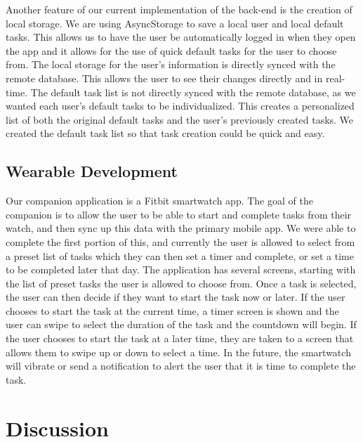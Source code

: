 \documentclass{sigchi}
\begin{document}
Another feature of our current implementation of the back-end is the creation
of local storage. We are using AsyncStorage to save a local user and local
default tasks. This allows us to have the user be automatically logged in when
they open the app and it allows for the use of quick default tasks for the user
to choose from. The local storage for the user’s information is directly synced
with the remote database. This allows the user to see their changes directly
and in real-time. The default task list is not directly synced with the remote
database, as we wanted each user’s default tasks to be individualized. This
creates a personalized list of both the original default tasks and the user’s
previously created tasks. We created the default task list so that task
creation could be quick and easy.

\subsection{Wearable Development}
Our companion application is a Fitbit smartwatch app. The goal of the companion
is to allow the user to be able to start and complete tasks from their watch,
and then sync up this data with the primary mobile app. We were able to complete
the first portion of this, and currently the user is allowed to select from a
preset list of tasks which they can then set a timer and complete, or set a
time to be completed later that day. The application has several screens,
starting with the list of preset tasks the user is allowed to choose from. Once
a task is selected, the user can then decide if they want to start the task
now or later. If the user chooses to start the task at the current time, a
timer screen is shown and the user can swipe to select the duration of the task
and the countdown will begin. If the user chooses to start the task at a later
time, they are taken to a screen that allows them to swipe up or down to select
a time. In the future, the smartwatch will vibrate or send a notification to
alert the user that it is time to complete the task.


\section{Discussion}
\end{document}
